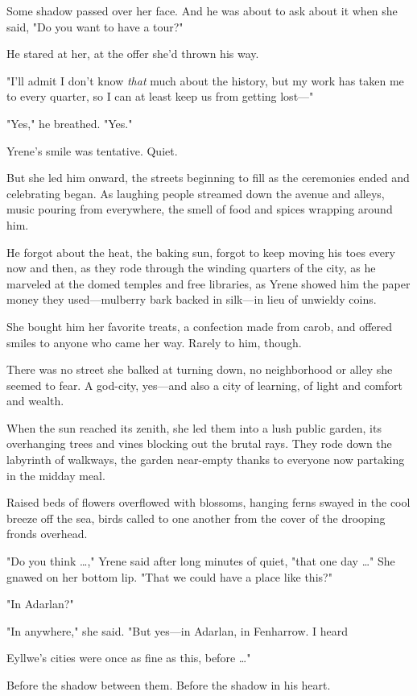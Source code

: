 Some shadow passed over her face. And he was about to ask about it when she said, "Do you want to have a tour?"

He stared at her, at the offer she'd thrown his way.

"I'll admit I don't know \emph{that} much about the history, but my work has taken me to every quarter, so I can at least keep us from getting lost---"

"Yes," he breathed. "Yes."

Yrene's smile was tentative. Quiet.

But she led him onward, the streets beginning to fill as the ceremonies ended and celebrating began. As laughing people streamed down the avenue and alleys, music pouring from everywhere, the smell of food and spices wrapping around him.

He forgot about the heat, the baking sun, forgot to keep moving his toes every now and then, as they rode through the winding quarters of the city, as he marveled at the domed temples and free libraries, as Yrene showed him the paper money they used---mulberry bark backed in silk---in lieu of unwieldy coins.

She bought him her favorite treats, a confection made from carob, and offered smiles to anyone who came her way. Rarely to him, though.

There was no street she balked at turning down, no neighborhood or alley she seemed to fear. A god-city, yes---and also a city of learning, of light and comfort and wealth.

When the sun reached its zenith, she led them into a lush public garden, its overhanging trees and vines blocking out the brutal rays. They rode down the labyrinth of walkways, the garden near-empty thanks to everyone now partaking in the midday meal.

Raised beds of flowers overflowed with blossoms, hanging ferns swayed in the cool breeze off the sea, birds called to one another from the cover of the drooping fronds overhead.

"Do you think \ldots," Yrene said after long minutes of quiet, "that one day \ldots" She gnawed on her bottom lip. "That we could have a place like this?"

"In Adarlan?"

"In anywhere," she said. "But yes---in Adarlan, in Fenharrow. I heard

Eyllwe's cities were once as fine as this, before \ldots"

Before the shadow between them. Before the shadow in his heart.

